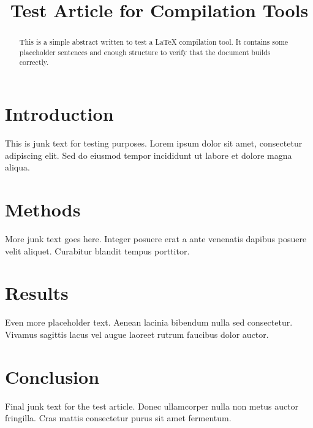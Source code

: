 \documentclass{article}
\title{Test Article for Compilation Tools}
\author{}
\date{}
\begin{document}
\maketitle

\begin{abstract}
This is a simple abstract written to test a LaTeX compilation tool. It contains some placeholder sentences and enough structure to verify that the document builds correctly.
\end{abstract}

\section{Introduction}
This is junk text for testing purposes. Lorem ipsum dolor sit amet, consectetur adipiscing elit. Sed do eiusmod tempor incididunt ut labore et dolore magna aliqua.

\section{Methods}
More junk text goes here. Integer posuere erat a ante venenatis dapibus posuere velit aliquet. Curabitur blandit tempus porttitor.

\section{Results}
Even more placeholder text. Aenean lacinia bibendum nulla sed consectetur. Vivamus sagittis lacus vel augue laoreet rutrum faucibus dolor auctor.

\section{Conclusion}
Final junk text for the test article. Donec ullamcorper nulla non metus auctor fringilla. Cras mattis consectetur purus sit amet fermentum.
\end{document}
